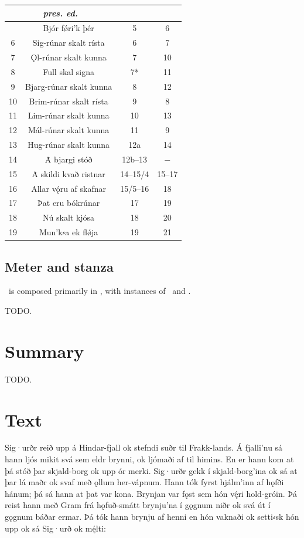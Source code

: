 \begin{longtable}{|c c c c|}
	\hline
	\multicolumn{2}{|c}{\emph{pres. ed.}} & \Regius & \VolsungaMS \\ [0.5ex]
	\hline\hline\endhead
	\hline\endfoot
	5 & Bjór fǿri’k þér & 5 & 6 \\
	6 & Sig-rúnar skalt rísta & 6 & 7 \\
  7 & Ǫl-rúnar skalt kunna & 7 & 10 \\
  8 & Full skal signa & 7* & 11 \\
  9 & Bjarg-rúnar skalt kunna & 8 & 12 \\
  10 & Brim-rúnar skalt rísta & 9 & 8 \\
  11 & Lim-rúnar skalt kunna & 10 & 13 \\
  12 & Mál-rúnar skalt kunna & 11 & 9 \\
  13 & Hug-rúnar skalt kunna & 12a & 14 \\
  14 & Ȧ bjargi stóð & 12b--13 & − \\
  15 & Ȧ skildi kvað ristnar & 14--15/4 & 15--17 \\
  16 & Allar vǫ́ru af skafnar & 15/5--16 & 18 \\
  17 & Þat eru bókrúnar & 17 & 19 \\
  18 & Nú skalt kjósa & 18 & 20 \\
  19 & Mun’k⸗a ek flǿja & 19 & 21 \\ [1ex]
	\hline
\end{longtable}

\subsection{Meter and stanza}

\Sigrdrifumal\ is composed primarily in \Ljodahattr, with instances of \Malahattr\ and \Fornyrdislag.

TODO.

\section{Summary}

TODO.

\sectionline

\newpage

\section{Text}

\bpg\bpa Sig·urðr reið upp á Hindar-fjall ok stefndi suðr til Frakk-lands. Á fjalli’nu sá hann ljós mikit svá sem eldr brynni, ok ljómaði af til himins. En er hann kom at þá stóð þar skjald-borg ok upp ór merki. Sig·urðr gekk í skjald-borg’ina ok sá at þar lá maðr ok svaf með ǫllum her-vápnum. Hann tók fyrst hjálm’inn af hǫfði hánum; þá sá hann at þat var kona. Brynjan var fǫst sem hón vę́ri hold-gróin. Þá reist hann með Gram frá hǫfuð-smátt brynju’na í gǫgnum niðr ok svá út í gǫgnum báðar ermar. Þá tók hann brynju af henni en hón vaknaði ok setti⸗sk hón upp ok sá Sig·urð ok mę́lti:\epa

